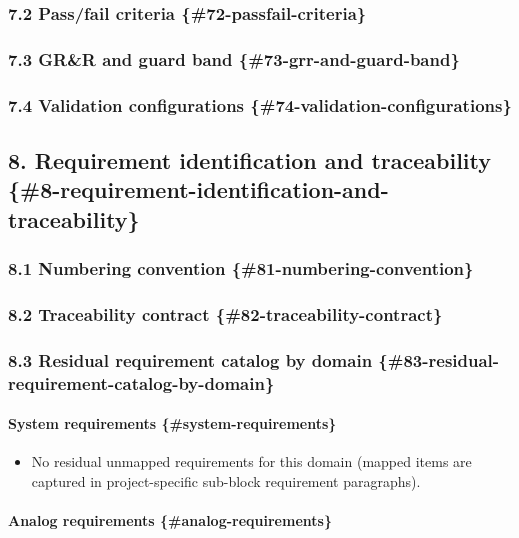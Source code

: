\documentclass[11pt]{article}
\begin{document}
\subsubsection{7.2 Pass/fail criteria \{\#72-passfail-criteria\}}


\subsubsection{7.3 GR\&R and guard band \{\#73-grr-and-guard-band\}}


\subsubsection{7.4 Validation configurations \{\#74-validation-configurations\}}


\subsection{8. Requirement identification and traceability \{\#8-requirement-identification-and-traceability\}}


\subsubsection{8.1 Numbering convention \{\#81-numbering-convention\}}


\subsubsection{8.2 Traceability contract \{\#82-traceability-contract\}}


\subsubsection{8.3 Residual requirement catalog by domain \{\#83-residual-requirement-catalog-by-domain\}}


\paragraph{System requirements \{\#system-requirements\}}


\begin{itemize}
\item No residual unmapped requirements for this domain (mapped items are captured in project-specific sub-block requirement paragraphs).
\end{itemize}

\paragraph{Analog requirements \{\#analog-requirements\}}
\end{document}
